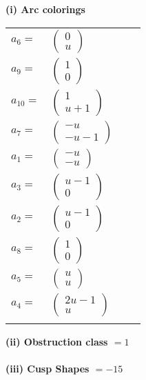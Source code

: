 \documentclass[1p]{elsarticle_modified}
\theoremstyle{definition}
\begin{document}
\flushleft \textbf{(i) Arc colorings}\\
\begin{tabular}{m{7pt} m{180pt} m{7pt} m{180pt} }
\flushright $a_{6}=$&$\begin{pmatrix}0\\u\end{pmatrix}$ \\
\flushright $a_{9}=$&$\begin{pmatrix}1\\0\end{pmatrix}$ \\
\flushright $a_{10}=$&$\begin{pmatrix}1\\u+1\end{pmatrix}$ \\
\flushright $a_{7}=$&$\begin{pmatrix}- u\\- u-1\end{pmatrix}$ \\
\flushright $a_{1}=$&$\begin{pmatrix}- u\\- u\end{pmatrix}$ \\
\flushright $a_{3}=$&$\begin{pmatrix}u-1\\0\end{pmatrix}$ \\
\flushright $a_{2}=$&$\begin{pmatrix}u-1\\0\end{pmatrix}$ \\
\flushright $a_{8}=$&$\begin{pmatrix}1\\0\end{pmatrix}$ \\
\flushright $a_{5}=$&$\begin{pmatrix}u\\u\end{pmatrix}$ \\
\flushright $a_{4}=$&$\begin{pmatrix}2 u-1\\u\end{pmatrix}$\\&\end{tabular}
\flushleft \textbf{(ii) Obstruction class $= 1$}\\~\\
\flushleft \textbf{(iii) Cusp Shapes $= -15$}\\~\\
\end{document}
